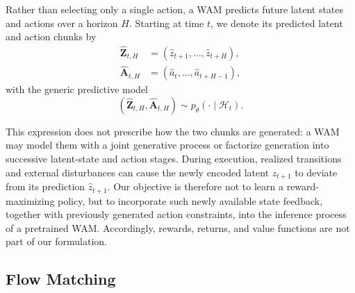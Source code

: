Rather than selecting only a single action, a WAM predicts future latent states and
actions over a horizon $H$. Starting at time $t$, we denote its predicted latent
and action chunks by
\begin{equation}
    \begin{aligned}
    \hat{\mathbf{Z}}_{t,H}
    &= (\hat z_{t+1},\ldots,\hat z_{t+H}),\\
    \hat{\mathbf{A}}_{t,H}
    &= (\hat a_t,\ldots,\hat a_{t+H-1}),
    \end{aligned}
    \label{eq:wam-prediction-chunks}
\end{equation}
with the generic predictive model
\begin{equation}
    (\hat{\mathbf{Z}}_{t,H},\hat{\mathbf{A}}_{t,H})
    \sim p_\theta(\cdot\mid\mathcal{H}_t).
    \label{eq:wam-predictive-model}
\end{equation}

This expression does not prescribe how the two chunks are generated: a WAM may
model them with a joint generative process or factorize generation into successive
latent-state and action stages. During execution, realized transitions and external
disturbances can cause the newly encoded latent $z_{t+1}$ to deviate from its
prediction $\hat z_{t+1}$. Our objective is therefore not to learn a
reward-maximizing policy, but to incorporate such newly available state feedback,
together with previously generated action constraints, into the inference process of
a pretrained WAM. Accordingly, rewards, returns, and value functions are not part of
our formulation.

\subsection{Flow Matching}
\label{sec:preliminaries:flow-matching}

